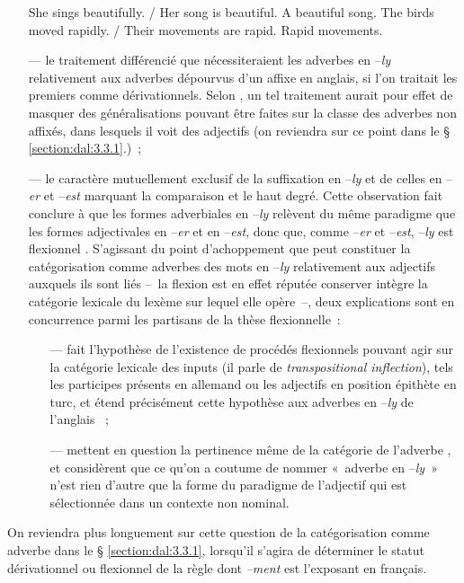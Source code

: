 \documentclass[output=paper]{langsci/langscibook}
\begin{document}
\begin{itemize}
\ea\label{ex:Dal:7}
    \ea She sings beautifully. / Her song is beautiful. A beautiful song.
    \ex The birds moved rapidly. / Their movements are rapid. Rapid movements.
\z\z

\item[---] le traitement différencié que nécessiteraient les adverbes en --\emph{ly} relativement aux adverbes dépourvus d'un affixe en anglais, si l'on traitait les premiers comme dérivationnels. Selon %
\citet{Giegerich12}%
%
, un tel traitement aurait pour effet de masquer des généralisations pouvant être faites sur la classe des adverbes non affixés, dans lesquels il voit des adjectifs (on reviendra sur ce point dans le § \ref{section:dal:3.3.1}.)~;

\item[---] le caractère mutuellement exclusif de la suffixation en --\emph{ly} et de celles en --\emph{er} et --\emph{est} marquant la comparaison et le haut degré. Cette observation fait conclure à %
\citet{Hockett58} %
%
que les formes adverbiales en --\emph{ly} relèvent du même paradigme que les formes adjectivales en --\emph{er} et en --\emph{est}, donc que, comme --\emph{er} et --\emph{est}, --\emph{ly} est flexionnel %
\citep[cf. aussi ][]{Giegerich12}%
%
.
S'agissant du point d'achoppement que peut constituer la catégorisation comme adverbes des mots en --\emph{ly} relativement aux adjectifs auxquels ils sont liés --~la flexion est en effet réputée conserver intègre la catégorie lexicale du lexème sur lequel elle opère~--, deux explications sont en concurrence parmi les partisans de la thèse flexionnelle~:

\begin{itemize}
\item[---] %
\citet{Haspelmath1996} %
%
fait l'hypothèse de l'existence de procédés flexionnels pouvant agir sur la catégorie lexicale des inputs (il parle de \emph{transpositional inflection}), tels les participes présents en allemand ou les adjectifs en position épithète en turc, et étend précisément cette hypothèse aux adverbes en --\emph{ly} de l'anglais %
\citep[cf. aussi ][]{Bybee85}%
%
~;

\item[---] %
\citet{SugiokaLehr1983} %
%
 mettent en question la pertinence même de la catégorie de l'adverbe %
\citep[cf. aussi entre autres ][]{Fabregas14}%
%
, et considèrent que ce qu'on a coutume de nommer «~adverbe en --\emph{ly}~» n'est rien d'autre que la forme du paradigme de l'adjectif qui est sélectionnée dans un contexte non nominal.

\end{itemize}
\end{itemize}
On reviendra plus longuement sur cette question de la catégorisation comme adverbe dans le § \ref{section:dal:3.3.1}, lorsqu'il s'agira de déterminer le statut dérivationnel ou flexionnel de la règle dont \emph{--ment} est l'exposant en français.
\end{document}
